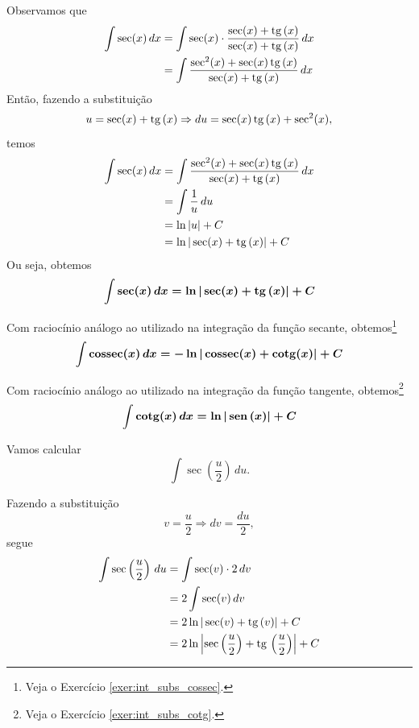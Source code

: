 \cleardoublepage\documentclass[../main.tex]{subfiles}
\begin{document}
Observamos que
\begin{align*}
  \int\sec(x)\,dx &= \int \sec(x)\cdot\frac{\sec(x)+\operatorname{tg}\,(x)}{\sec(x)+\operatorname{tg}\,(x)}\,dx \\
                  &= \int \frac{\sec^2(x)+\sec(x)\operatorname{tg}\,(x)}{\sec(x)+\operatorname{tg}\,(x)}\,dx
\end{align*}
Então, fazendo a substituição
\begin{equation*}
  u = \sec(x) + \operatorname{tg}\,(x) \Rightarrow du = \sec(x)\operatorname{tg}\,(x) + \sec^2(x),
\end{equation*}
temos
\begin{align*}
  \int\sec(x)\,dx &= \int\frac{\sec^2(x)+\sec(x)\operatorname{tg}\,(x)}{\sec(x)+\operatorname{tg}\,(x)}\,dx \\
                  &= \int\frac{1}{u}\,du \\
                  &= \ln|u| + C \\
                  &= \ln|\sec(x)+\operatorname{tg}\,(x)| + C
\end{align*}
Ou seja, obtemos
\begin{equation}
  \boldsymbol{\int\sec(x)\,dx = \ln|\sec(x)+\operatorname{tg}\,(x)|+C}
\end{equation}
\begin{obs}
Com raciocínio análogo ao utilizado na integração da função secante, obtemos\footnote{Veja o Exercício \ref{exer:int_subs_cossec}.}
\begin{equation}
  \boldsymbol{\int \operatorname{cossec}(x)\,dx = -\ln|\operatorname{cossec}(x)+\operatorname{cotg}(x)| + C}
\end{equation}
\end{obs}

\begin{obs}
Com raciocínio análogo ao utilizado na integração da função tangente, obtemos\footnote{Veja o Exercício \ref{exer:int_subs_cotg}.}
\begin{equation}
  \boldsymbol{\int \operatorname{cotg}(x)\,dx = \ln|\operatorname{sen}\,(x)| + C}
\end{equation}
\end{obs}

\begin{ex}
  Vamos calcular
  \begin{equation*}
    \int\sec\left(\frac{u}{2}\right)\,du.
  \end{equation*}
  \begin{sol}
  Fazendo a substituição
  \begin{equation*}
    v = \frac{u}{2} \Rightarrow dv = \frac{du}{2},
  \end{equation*}
  segue
  \begin{align*}
    \int\sec\left(\frac{u}{2}\right)\,du &= \int\sec(v)\cdot 2\,dv \\
                                         &= 2\int \sec(v)\,dv \\
                                         &= 2\ln|\sec(v)+\operatorname{tg}\,(v)| + C \\
                                         &= 2\ln\left|\sec\left(\frac{u}{2}\right)+\operatorname{tg}\,\left(\frac{u}{2}\right)\right| + C
  \end{align*}
  \end{sol}
\end{ex}
\end{document}
